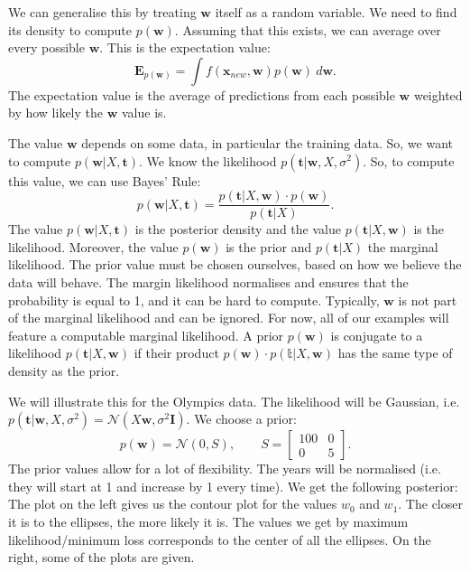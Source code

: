 \documentclass[a4paper, openany]{memoir}
\begin{document}
    We can generalise this by treating $\mathbf{w}$ itself as a random variable. We need to find its density to compute $p(\mathbf{w})$. Assuming that this exists, we can average over every possible $\mathbf{w}$. This is the expectation value:
    \[\mathbf{E}_{p(\mathbf{w})} = \int f(\mathbf{x}_{new}, \mathbf{w}) p(\mathbf{w}) \ d\mathbf{w}.\]
    The expectation value is the average of predictions from each possible $\mathbf{w}$ weighted by how likely the $\mathbf{w}$ value is.

    The value $\mathbf{w}$ depends on some data, in particular the training data. So, we want to compute $p(\mathbf{w}|X, \mathbf{t})$. We know the likelihood $p(\mathbf{t}|\mathbf{w}, X, \sigma^2)$. So, to compute this value, we can use Bayes' Rule:
    \[p(\mathbf{w}|X, \mathbf{t}) = \frac{p(\mathbf{t}|X, \mathbf{w}) \cdot p(\mathbf{w})}{p(\mathbf{t}|X)}.\]
    The value $p(\mathbf{w}|X, \mathbf{t})$ is the posterior density and the value $p(\mathbf{t}|X, \mathbf{w})$ is the likelihood. Moreover, the value $p(\mathbf{w})$ is the prior and $p(\mathbf{t}|X)$ the marginal likelihood. The prior value must be chosen ourselves, based on how we believe the data will behave. The margin likelihood normalises and ensures that the probability is equal to 1, and it can be hard to compute. Typically, $\mathbf{w}$ is not part of the marginal likelihood and can be ignored. For now, all of our examples will feature a computable marginal likelihood. A prior $p(\mathbf{w})$ is conjugate to a likelihood $p(\mathbf{t}|X, \mathbf{w})$ if their product $p(\mathbf{w}) \cdot p(\mathbb{t}|X, \mathbf{w})$ has the same type of density as the prior. 

    We will illustrate this for the Olympics data. The likelihood will be Gaussian, i.e. $p(\mathbf{t}|\mathbf{w}, X, \sigma^2) = \mathcal{N}(X\mathbf{w}, \sigma^2 \mathbf{I})$. We choose a prior: 
    \[p(\mathbf{w}) = \mathcal{N}(0, S), \qquad S = \begin{bmatrix}
        100 & 0 \\
        0 & 5
    \end{bmatrix}.\]
    The prior values allow for a lot of flexibility. The years will be normalised (i.e. they will start at 1 and increase by 1 every time). We get the following posterior:
    The plot on the left gives us the contour plot for the values $w_0$ and $w_1$. The closer it is to the ellipses, the more likely it is. The values we get by maximum likelihood/minimum loss corresponds to the center of all the ellipses. On the right, some of the plots are given.
\end{document}
